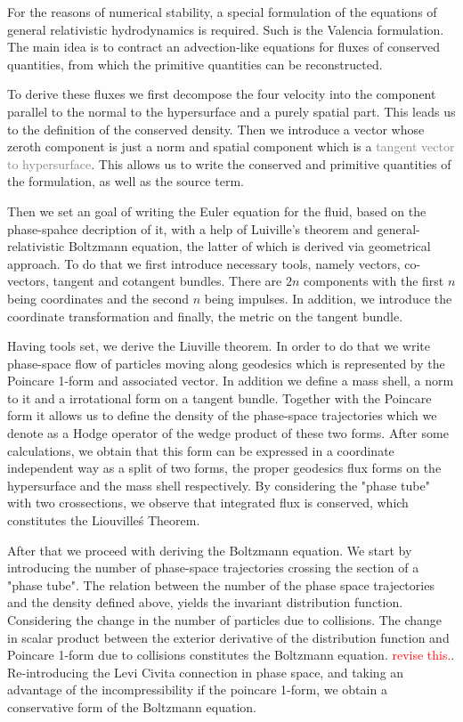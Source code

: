For the reasons of numerical stability, a special formulation of the equations of general relativistic hydrodynamics is required. 
Such is the Valencia formulation. The main idea is to contract an advection-like equations for fluxes of conserved quantities, from which the primitive quantities can be reconstructed.

To derive these fluxes we first decompose the four velocity into the component parallel to the normal to the hypersurface and a purely spatial part. 
This leads us to the definition of the conserved density. Then we introduce a vector whose zeroth component is just a norm and spatial component which is a \textcolor{gray}{tangent vector to hypersurface}. 
This allows us to write the conserved and primitive quantities of the formulation, as well as the source term. 

Then we set an goal of writing the Euler equation for the fluid, based on the phase-spahce decription of it, with a help of Luiville's theorem and general-relativistic Boltzmann equation, the latter of which is derived via geometrical approach.
To do that we first introduce necessary tools, namely vectors, co-vectors, tangent and cotangent bundles.
There are $2n$ components with the first $n$ being coordinates and the second $n$ being impulses. 
In addition, we introduce the coordinate transformation and finally, the metric on the tangent bundle.

Having tools set, we derive the Liuville theorem. In order to do that we write phase-space flow of particles moving along geodesics which is represented by the Poincare 1-form and associated vector.
In addition we define a mass shell, a norm to it and a irrotational form on a tangent bundle. 
Together with the Poincare form it allows us to define the density of the phase-space trajectories which we denote as a Hodge operator of the wedge product of these two forms. 
After some calculations, we obtain that this form can be expressed in a coordinate independent way as a split of two forms, the proper geodesics flux forms on the hypersurface and the mass shell respectively.
By considering the "phase tube" with two crossections, we observe that integrated flux is conserved, which constitutes the Liouville\'s Theorem.

After that we proceed with deriving the Boltzmann equation. 
We start by introducing the number of phase-space trajectories crossing the section of a "phase tube". 
The relation between the number of the phase space trajectories and the density defined above, yields the invariant distribution function. 
Considering the change in the number of particles due to collisions. 
The change in scalar product between the exterior derivative of the distribution function and Poincare 1-form due to collisions constitutes the Boltzmann equation. 
\textcolor{red}{revise this.}. 
Re-introducing the Levi Civita connection in phase space, and taking an advantage of the incompressibility if the poincare 1-form, we obtain a conservative form of the Boltzmann equation.

